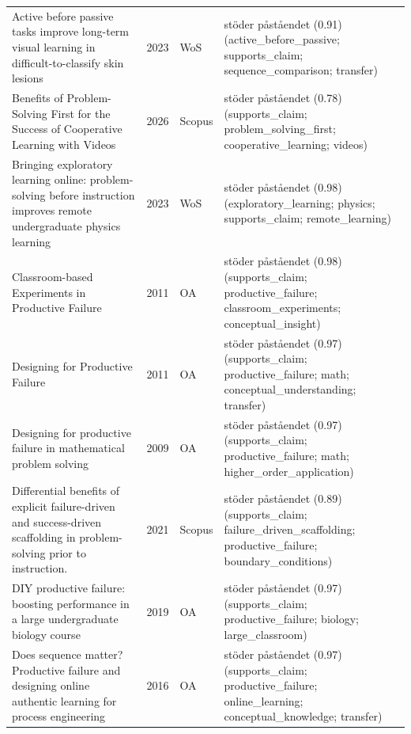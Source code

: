 \begin{longtable}{@{}%
  >{\raggedright\arraybackslash}p{}c%
  >{\raggedright\arraybackslash}p{}%
  >{\raggedright\arraybackslash\footnotesize}p{}@{}}
Active before passive tasks improve long-term visual learning in difficult-to-classify skin lesions & 2023 & WoS & stöder påståendet (0.91) (active\_\allowbreak{}before\_\allowbreak{}passive; supports\_\allowbreak{}claim; sequence\_\allowbreak{}comparison; transfer) \\
Benefits of Problem-Solving First for the Success of Cooperative Learning with Videos & 2026 & Scopus & stöder påståendet (0.78) (supports\_\allowbreak{}claim; problem\_\allowbreak{}solving\_\allowbreak{}first; cooperative\_\allowbreak{}learning; videos) \\
Bringing exploratory learning online: problem-solving before instruction improves remote undergraduate physics learning & 2023 & WoS & stöder påståendet (0.98) (exploratory\_\allowbreak{}learning; physics; supports\_\allowbreak{}claim; remote\_\allowbreak{}learning) \\
Classroom-based Experiments in Productive Failure & 2011 & OA & stöder påståendet (0.98) (supports\_\allowbreak{}claim; productive\_\allowbreak{}failure; classroom\_\allowbreak{}experiments; conceptual\_\allowbreak{}insight) \\
Designing for Productive Failure & 2011 & OA & stöder påståendet (0.97) (supports\_\allowbreak{}claim; productive\_\allowbreak{}failure; math; conceptual\_\allowbreak{}understanding; transfer) \\
Designing for productive failure in mathematical problem solving & 2009 & OA & stöder påståendet (0.97) (supports\_\allowbreak{}claim; productive\_\allowbreak{}failure; math; higher\_\allowbreak{}order\_\allowbreak{}application) \\
Differential benefits of explicit failure-driven and success-driven scaffolding in problem-solving prior to instruction. & 2021 & Scopus & stöder påståendet (0.89) (supports\_\allowbreak{}claim; failure\_\allowbreak{}driven\_\allowbreak{}scaffolding; productive\_\allowbreak{}failure; boundary\_\allowbreak{}conditions) \\
DIY productive failure: boosting performance in a large undergraduate biology course & 2019 & OA & stöder påståendet (0.97) (supports\_\allowbreak{}claim; productive\_\allowbreak{}failure; biology; large\_\allowbreak{}classroom) \\
Does sequence matter? Productive failure and designing online authentic learning for process engineering & 2016 & OA & stöder påståendet (0.97) (supports\_\allowbreak{}claim; productive\_\allowbreak{}failure; online\_\allowbreak{}learning; conceptual\_\allowbreak{}knowledge; transfer) \\

\end{longtable}
